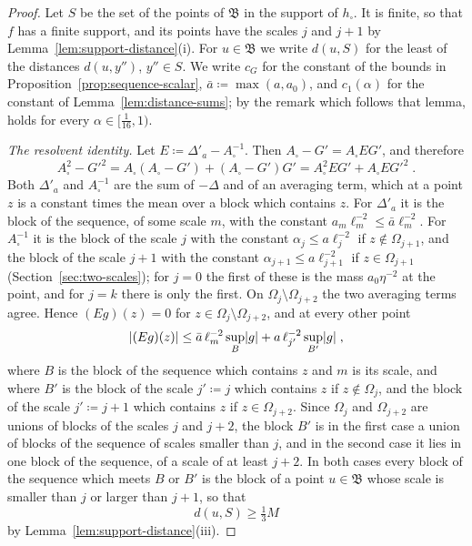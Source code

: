 \documentclass[11pt]{preprint}
\DeclarePairedDelimiter{\abs}{\lvert}{\rvert}
\numberwithin{equation}{section}
\theoremstyle{definition}
\theoremstyle{remark}
\theoremstyle{plain}
\begin{document}
\begin{proof}
Let $S$ be the set of the points of $\mathfrak B$ in the support of $h_\square$. It is finite, so that $f$ has a finite support, and its points have the scales $j$ and $j + 1$ by Lemma~\ref{lem:support-distance}(i). For $u \in \mathfrak B$ we write $d(u, S)$ for the least of the distances $d(u, y'')$, $y'' \in S$. We write $c_G$ for the constant of the bounds \cite[(2.67)]{BalabanPRT2} in Proposition~\ref{prop:sequence-scalar}, $\bar a \coloneqq \max(a, a_0)$, and $c_1(\alpha)$ for the constant of Lemma~\ref{lem:distance-sums}; by the remark which follows that lemma, \cite[(2.61)]{BalabanPRT2} holds for every $\alpha \in [\frac{1}{16}, 1)$.

\emph{The resolvent identity.} Let $E \coloneqq \Delta'_a - A_\square^{-1}$. Then $A_\square - G' = A_\square EG'$, and therefore
\begin{equation}\label{eq:resolvent-squares}
    A_\square^2 - G'^2 = A_\square(A_\square - G') + (A_\square - G')G' = A_\square^2EG' + A_\square EG'^2\;.
\end{equation}
Both $\Delta'_a$ and $A_\square^{-1}$ are the sum of $-\Delta$ and of an averaging term, which at a point $z$ is a constant times the mean over a block which contains $z$. For $\Delta'_a$ it is the block of the sequence, of some scale $m$, with the constant $a_m\ell_m^{-2} \leq \bar a\ell_m^{-2}$. For $A_\square^{-1}$ it is the block of the scale $j$ with the constant $\alpha_j \leq a\ell_j^{-2}$ if $z \notin \Omega_{j+1}$, and the block of the scale $j + 1$ with the constant $\alpha_{j+1} \leq a\ell_{j+1}^{-2}$ if $z \in \Omega_{j+1}$ (Section~\ref{sec:two-scales}); for $j = 0$ the first of these is the mass $a_0\eta^{-2}$ at the point, and for $j = k$ there is only the first. On $\Omega_j \setminus \Omega_{j+2}$ the two averaging terms agree. Hence $(Eg)(z) = 0$ for $z \in \Omega_j \setminus \Omega_{j+2}$, and at every other point
\begin{equation}\label{eq:difference-terms}
    \abs{(Eg)(z)} \leq \bar a\,\ell_m^{-2}\sup_B\abs g + a\,\ell_{j'}^{-2}\sup_{B'}\abs g\;,
\end{equation}
where $B$ is the block of the sequence which contains $z$ and $m$ is its scale, and where $B'$ is the block of the scale $j' \coloneqq j$ which contains $z$ if $z \notin \Omega_j$, and the block of the scale $j' \coloneqq j + 1$ which contains $z$ if $z \in \Omega_{j+2}$. Since $\Omega_j$ and $\Omega_{j+2}$ are unions of blocks of the scales $j$ and $j + 2$, the block $B'$ is in the first case a union of blocks of the sequence of scales smaller than $j$, and in the second case it lies in one block of the sequence, of a scale of at least $j + 2$. In both cases every block of the sequence which meets $B$ or $B'$ is the block of a point $u \in \mathfrak B$ whose scale is smaller than $j$ or larger than $j + 1$, so that
\begin{equation}\label{eq:far-blocks}
    d(u, S) \geq \tfrac13M
\end{equation}
by Lemma~\ref{lem:support-distance}(iii).


\end{proof}
\end{document}

